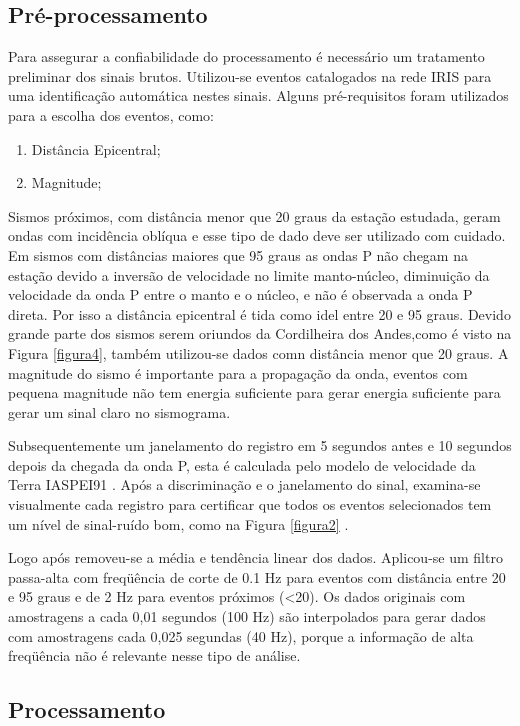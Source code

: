\subsection*{Pré-processamento}

Para assegurar a confiabilidade do processamento é necessário um tratamento preliminar dos sinais brutos. Utilizou-se eventos catalogados na rede IRIS para uma identificação automática nestes sinais. Alguns pré-requisitos foram utilizados para a escolha dos eventos, como:

\begin{enumerate}
\item Distância Epicentral;
\item Magnitude;
\end{enumerate}

Sismos próximos, com distância menor que 20 graus da estação estudada, geram ondas com incidência oblíqua e esse tipo de dado deve ser utilizado com cuidado. Em sismos com distâncias maiores que 95 graus as ondas P não chegam na estação devido a inversão de velocidade no limite manto-núcleo, diminuição da velocidade da onda P entre o manto e o núcleo, e não é observada a onda P direta. Por isso a distância epicentral é tida como idel entre 20 e 95 graus. Devido grande parte dos sismos serem oriundos da Cordilheira dos Andes,como é visto na Figura \ref{figura4}, também utilizou-se dados comn distância menor que 20 graus. A magnitude do sismo é importante para a propagação da onda, eventos com pequena magnitude não tem energia suficiente para gerar energia suficiente para gerar um sinal claro no sismograma.

Subsequentemente um janelamento do registro em 5 segundos antes e 10 segundos depois da chegada da onda P, esta é calculada pelo modelo de velocidade da Terra  IASPEI91 \citep{kennet_iaspei_1991}. Após a discriminação e o janelamento do sinal, examina-se visualmente cada registro para certificar que todos os eventos selecionados tem um nível de sinal-ruído bom, como na Figura \ref{figura2} . 

Logo após removeu-se a média e tendência linear dos dados. Aplicou-se um filtro passa-alta com freqüência de corte de 0.1 Hz para eventos com distância entre 20 e 95 graus e de 2 Hz para eventos próximos (<20). Os dados originais com amostragens a cada 0,01 segundos (100 Hz) são interpolados para gerar dados com amostragens cada 0,025 segundas (40 Hz), porque a informação de alta freqüência não é relevante nesse tipo de análise.

\subsection*{Processamento}


